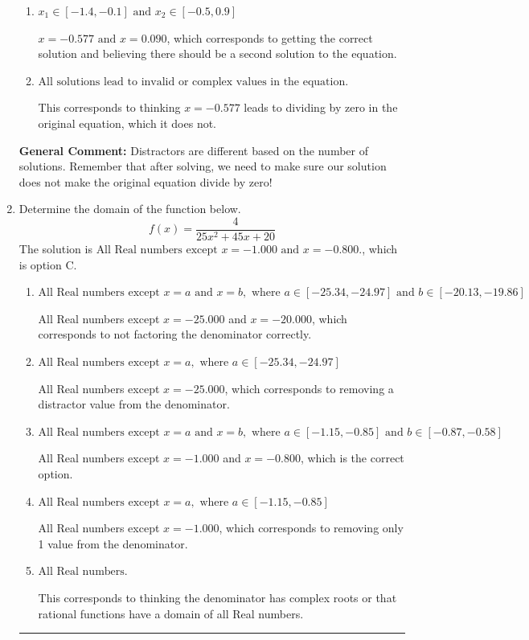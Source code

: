 \documentclass{extbook}[14pt]
\newcommand{\litem}[1]{\item #1

\rule{\textwidth}{0.4pt}}
\begin{document}
\begin{enumerate}
{\begin{enumerate}[label=\Alph*.]
$x = 0.090$, which corresponds to not distributing the factor $-6x -2$ correctly when trying to eliminate the fraction.
\item \( x_1 \in [-1.4, -0.1] \text{ and } x_2 \in [-0.5,0.9] \)

$x = -0.577 \text{ and } x = 0.090$, which corresponds to getting the correct solution and believing there should be a second solution to the equation.
\item \( \text{All solutions lead to invalid or complex values in the equation.} \)

This corresponds to thinking $x = -0.577$ leads to dividing by zero in the original equation, which it does not.
\end{enumerate}

\textbf{General Comment:} Distractors are different based on the number of solutions. Remember that after solving, we need to make sure our solution does not make the original equation divide by zero!
}
\litem{
Determine the domain of the function below.
\[ f(x) = \frac{4}{25x^{2} +45 x + 20} \]The solution is \( \text{All Real numbers except } x = -1.000 \text{ and } x = -0.800. \), which is option C.\begin{enumerate}[label=\Alph*.]
\item \( \text{All Real numbers except } x = a \text{ and } x = b, \text{ where } a \in [-25.34, -24.97] \text{ and } b \in [-20.13, -19.86] \)

All Real numbers except $x = -25.000$ and $x = -20.000$, which corresponds to not factoring the denominator correctly.
\item \( \text{All Real numbers except } x = a, \text{ where } a \in [-25.34, -24.97] \)

All Real numbers except $x = -25.000$, which corresponds to removing a distractor value from the denominator.
\item \( \text{All Real numbers except } x = a \text{ and } x = b, \text{ where } a \in [-1.15, -0.85] \text{ and } b \in [-0.87, -0.58] \)

All Real numbers except $x = -1.000$ and $x = -0.800$, which is the correct option.
\item \( \text{All Real numbers except } x = a, \text{ where } a \in [-1.15, -0.85] \)

All Real numbers except $x = -1.000$, which corresponds to removing only 1 value from the denominator.
\item \( \text{All Real numbers.} \)

This corresponds to thinking the denominator has complex roots or that rational functions have a domain of all Real numbers.
\end{enumerate}

}
\end{enumerate}
\end{document}

